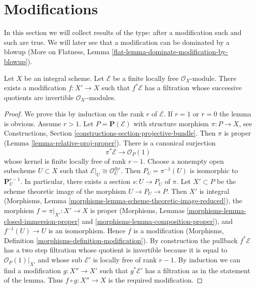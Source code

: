 \section{Modifications}
\label{section-modifications}

\noindent
In this section we will collect results of the type: after a modification
such and such are true. We will later see that a modification can be
dominated by a blowup (More on Flatness, Lemma
\ref{flat-lemma-dominate-modification-by-blowup}).

\begin{lemma}
\label{lemma-filter-after-modification}
Let $X$ be an integral scheme. Let $\mathcal{E}$ be a finite locally free
$\mathcal{O}_X$-module. There exists a modification $f : X' \to X$
such that $f^*\mathcal{E}$ has a filtration whose successive quotients
are invertible $\mathcal{O}_{X'}$-modules.
\end{lemma}

\begin{proof}
We prove this by induction on the rank $r$ of $\mathcal{E}$.
If $r = 1$ or $r = 0$ the lemma is obvious. Assume $r > 1$.
Let $P = \mathbf{P}(\mathcal{E})$ with structure morphism $\pi : P \to X$,
see Constructions, Section \ref{constructions-section-projective-bundle}.
Then $\pi$ is proper (Lemma \ref{lemma-relative-proj-proper}).
There is a canonical surjection
$$
\pi^*\mathcal{E} \to \mathcal{O}_P(1)
$$
whose kernel is finite locally free of rank $r - 1$.
Choose a nonempty open subscheme $U \subset X$ such that
$\mathcal{E}|_U \cong \mathcal{O}_U^{\oplus r}$.
Then $P_U = \pi^{-1}(U)$ is isomorphic to $\mathbf{P}^{r - 1}_U$.
In particular, there exists a section $s : U \to P_U$ of $\pi$.
Let $X' \subset P$ be the scheme theoretic image of the
morphism $U \to P_U \to P$. Then $X'$ is integral
(Morphisms, Lemma \ref{morphisms-lemma-scheme-theoretic-image-reduced}),
the morphism $f = \pi|_{X'} : X' \to X$ is proper (Morphisms, Lemmas
\ref{morphisms-lemma-closed-immersion-proper} and
\ref{morphisms-lemma-composition-proper}), and
$f^{-1}(U) \to U$ is an isomorphism. Hence $f$ is a modification
(Morphisms, Definition \ref{morphisms-definition-modification}).
By construction the pullback $f^*\mathcal{E}$ has a two step
filtration whose quotient is invertible because it is equal to
$\mathcal{O}_P(1)|_{X'}$ and whose sub $\mathcal{E}'$ is locally free of rank
$r - 1$. By induction we can find a modification $g : X'' \to X'$
such that $g^*\mathcal{E}'$ has a filtration as in the statement of
the lemma. Thus $f \circ g : X'' \to X$ is the required modification.
\end{proof}

